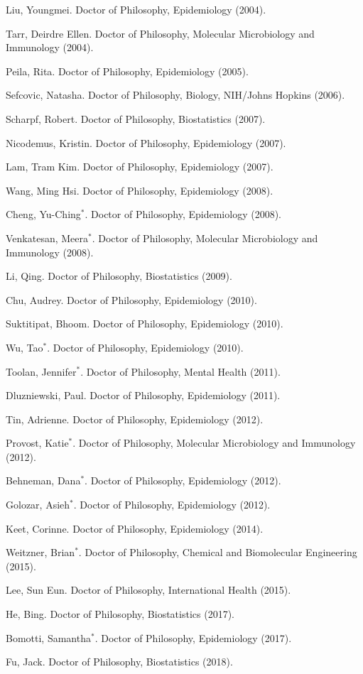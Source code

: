 \documentclass[10pt]{article}
\newcommand{\dn}[1]{{\color{black} {#1}}}
\begin{document}
\item \dn{Liu}, Youngmei. Doctor of Philosophy, Epidemiology (2004).
\item \dn{Tarr}, Deirdre Ellen. Doctor of Philosophy, Molecular Microbiology and Immunology (2004).
\item \dn{Peila}, Rita. Doctor of Philosophy, Epidemiology (2005).
\item \dn{Sefcovic}, Natasha. Doctor of Philosophy, Biology, NIH/Johns Hopkins (2006).
\item \dn{Scharpf}, Robert. Doctor of Philosophy, Biostatistics (2007).
\item \dn{Nicodemus}, Kristin. Doctor of Philosophy, Epidemiology (2007).
\item \dn{Lam}, Tram Kim. Doctor of Philosophy, Epidemiology (2007).
\item \dn{Wang}, Ming Hsi. Doctor of Philosophy, Epidemiology (2008).
\item \dn{Cheng}, Yu-Ching$^*$. Doctor of Philosophy, Epidemiology (2008).
\item \dn{Venkatesan}, Meera$^*$. Doctor of Philosophy, Molecular Microbiology and Immunology (2008).
\item \dn{Li}, Qing. Doctor of Philosophy, Biostatistics (2009).
\item \dn{Chu}, Audrey. Doctor of Philosophy, Epidemiology (2010).
\item \dn{Suktitipat}, Bhoom. Doctor of Philosophy, Epidemiology (2010).
\item \dn{Wu}, Tao$^*$. Doctor of Philosophy, Epidemiology (2010).
\item \dn{Toolan}, Jennifer$^*$. Doctor of Philosophy, Mental Health (2011).
\item \dn{Dluzniewski}, Paul. Doctor of Philosophy, Epidemiology (2011).
\item \dn{Tin}, Adrienne. Doctor of Philosophy, Epidemiology (2012).
\item \dn{Provost}, Katie$^*$. Doctor of Philosophy, Molecular Microbiology and Immunology (2012).
\item \dn{Behneman}, Dana$^*$. Doctor of Philosophy, Epidemiology (2012).
\item \dn{Golozar}, Asieh$^*$. Doctor of Philosophy, Epidemiology (2012).
\item \dn{Keet}, Corinne. Doctor of Philosophy, Epidemiology (2014).
\item \dn{Weitzner}, Brian$^*$. Doctor of Philosophy, Chemical and Biomolecular Engineering (2015).
\item \dn{Lee}, Sun Eun. Doctor of Philosophy, International Health (2015).
\item \dn{He}, Bing. Doctor of Philosophy, Biostatistics (2017).
\item \dn{Bomotti}, Samantha$^*$. Doctor of Philosophy, Epidemiology (2017).
\item \dn{Fu}, Jack. Doctor of Philosophy, Biostatistics (2018).
\end{document}
